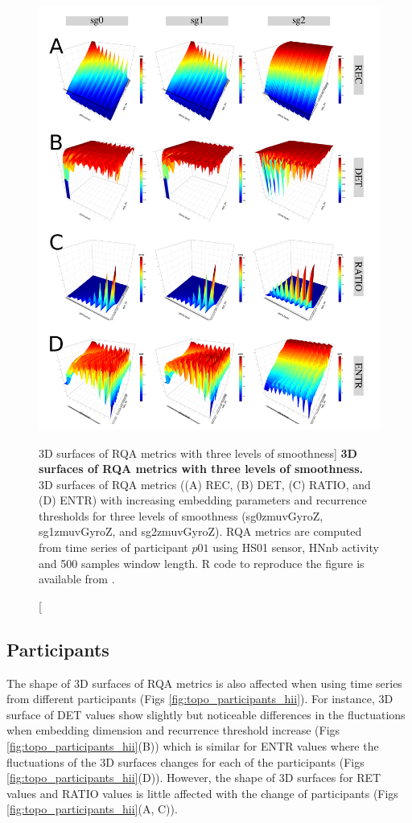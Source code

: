 \begin{figure}
\centering
\includegraphics[width=1.0\textwidth]{smoothness_w500}
    \caption
	[3D surfaces of RQA metrics with three levels of smoothness]{
	{\bf 3D surfaces of RQA metrics with three levels of smoothness.}
	3D surfaces of RQA metrics ((A) REC, (B) DET, (C) RATIO, and (D) ENTR) 
	with increasing embedding parameters and recurrence thresholds for 
	three levels of smoothness 
	(sg0zmuvGyroZ, sg1zmuvGyroZ, and sg2zmuvGyroZ).
	RQA metrics are computed from time series of participant $p01$ using 
	HS01 sensor, HNnb activity and 500 samples window length.
	R code to reproduce the figure is available from \cite{hwum2018}.
 }
\label{fig:topo_smoothness_hii}
\end{figure}

\subsection{Participants}
The shape of 3D surfaces of RQA metrics is also affected when using 
time series from different participants (Figs \ref{fig:topo_participants_hii}).
For instance, 3D surface of DET values show slightly but noticeable 
differences in the fluctuations when embedding dimension and recurrence 
threshold increase (Figs \ref{fig:topo_participants_hii}(B)) which is similar 
for ENTR values where the fluctuations of the 3D surfaces changes for each 
of the participants (Figs \ref{fig:topo_participants_hii}(D)).
However, the shape of 3D surfaces for RET values and RATIO values 
is little affected with the change of participants 
(Figs \ref{fig:topo_participants_hii}(A, C)).

